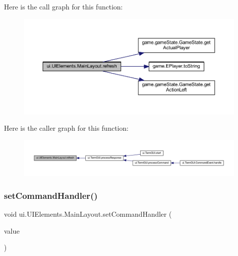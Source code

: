 Here is the call graph for this function\+:
\nopagebreak
\begin{figure}[H]
\begin{center}
\leavevmode
\includegraphics[width=350pt]{classui_1_1_u_i_elements_1_1_main_layout_a7714bf456435ac3ab559b3bf6182c022_cgraph}
\end{center}
\end{figure}
Here is the caller graph for this function\+:
\nopagebreak
\begin{figure}[H]
\begin{center}
\leavevmode
\includegraphics[width=350pt]{classui_1_1_u_i_elements_1_1_main_layout_a7714bf456435ac3ab559b3bf6182c022_icgraph}
\end{center}
\end{figure}
\mbox{\label{classui_1_1_u_i_elements_1_1_main_layout_a0e8ef77920e90c1c2243ba9510756c8d}} 
\subsubsection{\texorpdfstring{set\+Command\+Handler()}{setCommandHandler()}}
{\footnotesize\ttfamily void ui.\+U\+I\+Elements.\+Main\+Layout.\+set\+Command\+Handler (\begin{DoxyParamCaption}\item[{Event\+Handler$<$? super Key\+Event $>$}]{value }\end{DoxyParamCaption})\hspace{0.3cm}{\ttfamily [inline]}}

